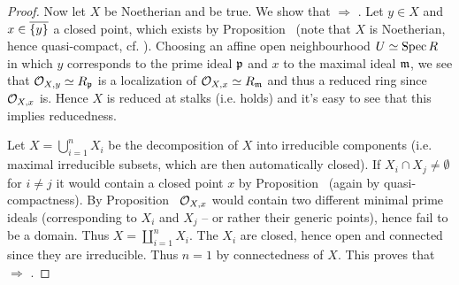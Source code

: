\documentclass[a4paper,parskip=half,numbers=enddot, DIV=12]{scrreprt}
\begin{document}
\begin{proof}
    Now let $X$ be Noetherian and  be true. We show that  $\Rightarrow$ . Let $y\in X$ and $x\in\overline{\{y\}}$ a closed point, which exists by Proposition~ (note that $X$ is Noetherian, hence quasi-compact, cf. \cite[Definition~2.1.2]{alg1}). Choosing an affine open neighbourhood $U\simeq \operatorname{Spec} R$ in which $y$ corresponds to the prime ideal $\mathfrak{p}$ and $x$ to the maximal ideal $\mathfrak{m}$, we see that $\mathcal{O}_{X,y}\simeq R_{\mathfrak{p}}$ is a localization of $\mathcal{O}_{X,x}\simeq R_{\mathfrak{m}}$ and thus a reduced ring since $\mathcal{O}_{X,x}$ is. Hence $X$ is reduced at stalks (i.e.  holds) and it's easy to see that this implies reducedness.
    
    Let $X=\bigcup_{i=1}^nX_i$ be the decomposition of $X$ into irreducible components (i.e. maximal irreducible subsets, which are then automatically closed). If $X_i\cap X_j \neq \emptyset$ for $i\neq j$ it would contain a closed point $x$ by Proposition~ (again by quasi-compactness). By Proposition~ $\mathcal{O}_{X,x}$ would contain two different minimal prime ideals (corresponding to $X_i$ and $X_j$ -- or rather their generic points), hence fail to be a domain. Thus $X=\coprod_{i=1}^nX_i$. The $X_i$ are closed, hence open and connected since they are irreducible. Thus $n=1$ by connectedness of $X$. This proves that  $\Rightarrow$ .
\end{proof}
\end{document}
